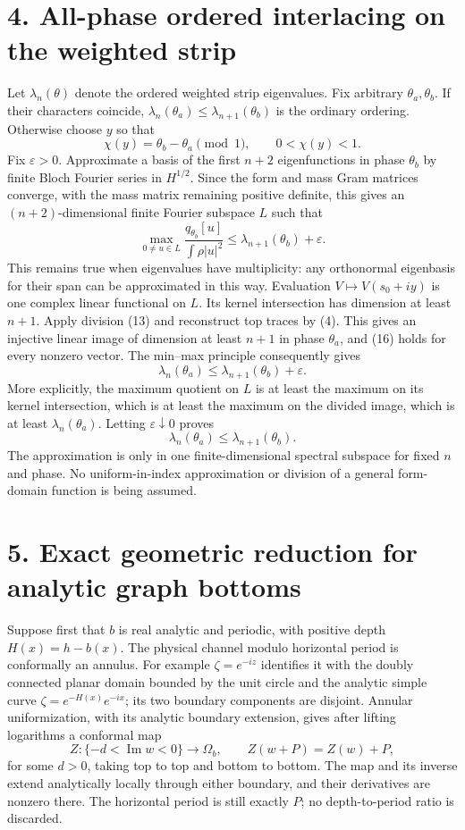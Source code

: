 \documentclass[11pt]{article}
\begin{document}
\section*{4. All-phase ordered interlacing on the weighted strip}
Let $\lambda_n(\theta)$ denote the ordered weighted strip
eigenvalues. Fix arbitrary $\theta_a,\theta_b$. If their characters
coincide, $\lambda_n(\theta_a)\le\lambda_{n+1}(\theta_b)$ is the
ordinary ordering. Otherwise choose $y$ so that
\[
 \chi(y)=\theta_b-\theta_a\pmod1,
 \qquad 0<\chi(y)<1. \tag{17}
\]
Fix $\varepsilon>0$. Approximate a basis of the first $n+2$
eigenfunctions in phase $\theta_b$ by finite Bloch Fourier series in
$H^{1/2}$. Since the form and mass Gram matrices converge, with the
mass matrix remaining positive definite, this gives an
$(n+2)$-dimensional finite Fourier subspace $L$ such that
\[
 \max_{0\ne u\in L}\frac{q_{\theta_b}[u]}{\int\rho|u|^2}
 \le\lambda_{n+1}(\theta_b)+\varepsilon. \tag{17a}
\]
This remains true when eigenvalues have multiplicity: any orthonormal
eigenbasis for their span can be approximated in this way.
Evaluation $V\mapsto V(s_0+iy)$ is one complex linear functional on
$L$. Its kernel intersection has dimension at least $n+1$.
Apply division (13) and reconstruct top traces by (4). This gives an
injective linear image of dimension at least $n+1$ in phase
$\theta_a$, and (16) holds for every nonzero vector. The min--max
principle consequently gives
\[
 \lambda_n(\theta_a)\le\lambda_{n+1}(\theta_b)+\varepsilon.
\]
More explicitly, the maximum quotient on $L$ is at least the maximum
on its kernel intersection, which is at least the maximum on the
divided image, which is at least $\lambda_n(\theta_a)$. Letting
$\varepsilon\downarrow0$ proves
\[
 \lambda_n(\theta_a)\le\lambda_{n+1}(\theta_b). \tag{18}
\]
The approximation is only in one finite-dimensional spectral
subspace for fixed $n$ and phase. No uniform-in-index approximation
or division of a general form-domain function is being assumed.

\section*{5. Exact geometric reduction for analytic graph bottoms}
Suppose first that $b$ is real analytic and periodic, with positive
depth $H(x)=h-b(x)$. The physical channel modulo horizontal period
is conformally an annulus. For example $\zeta=e^{-iz}$ identifies
it with the doubly connected planar domain bounded by the unit
circle and the analytic simple curve
$\zeta=e^{-H(x)}e^{-ix}$; its two boundary components are disjoint.
Annular uniformization, with its analytic boundary extension, gives
after lifting logarithms a conformal map
\[
 Z:\{-d<\operatorname{Im}w<0\}\longrightarrow\Omega_b,
 \qquad Z(w+P)=Z(w)+P, \tag{19}
\]
for some $d>0$, taking top to top and bottom to bottom. The map and
its inverse extend analytically locally through either boundary,
and their derivatives are nonzero there. The horizontal period is
still exactly $P$; no depth-to-period ratio is discarded.
\end{document}
